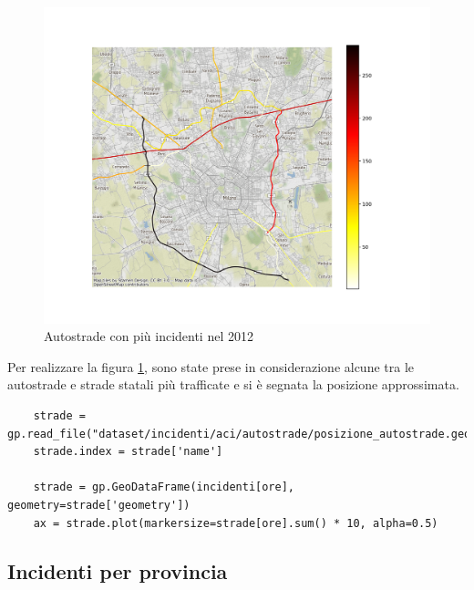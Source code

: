 \documentclass[a4paper]{report}
\begin{document}
\begin{figure}
    \includegraphics[width=\linewidth]{../src/incidenti/incidenti_aci/autostrade/incidenti_line_chart.png}
    \caption{Autostrade con più incidenti nel 2012}
    \label{fig:line-incidenti-milano}
\end{figure}

Per realizzare la figura \ref{fig:line-incidenti-milano}, sono state prese in considerazione alcune 
tra le autostrade e strade statali più trafficate e si è segnata la posizione approssimata.

\begin{lstlisting}
    strade = gp.read_file("dataset/incidenti/aci/autostrade/posizione_autostrade.geojson").to_crs(epsg=3857)
    strade.index = strade['name']

    strade = gp.GeoDataFrame(incidenti[ore], geometry=strade['geometry'])
    ax = strade.plot(markersize=strade[ore].sum() * 10, alpha=0.5)
\end{lstlisting}


\subsection{Incidenti per provincia}
\end{document}
